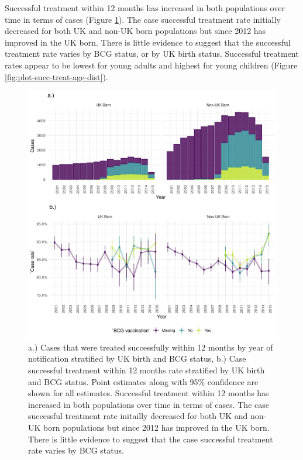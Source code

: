 \documentclass[11pt,twoside]{bristolthesis}
\begin{document}
  Successful treatment within 12 months has increased in both populations over time in terms of cases (Figure \ref{fig:plot-succ-treat-case-rate}). The case successful treatment rate initially decreased for both UK and non-UK born populations but since 2012 has improved in the UK born. There is little evidence to suggest that the successful treatment rate varies by BCG status, or by UK birth status. Successful treatment rates appear to be lowest for young adults and highest for young children (Figure \ref{fig:plot-succ-treat-age-dist}).
  \begin{figure}
  
  {\centering \includegraphics[width=0.8\linewidth,]{chapters/tb-epi-england/figures/plot-succ-treat-case-rate} 
  
  }
  
  \caption[a.) Cases that were treated successfully within 12 months by year of notification stratified by UK birth and BCG status, b.) Case successful treatment within 12 months rate stratified by UK birth and BCG status.]{a.) Cases that were treated successfully within 12 months by year of notification stratified by UK birth and BCG status, b.) Case successful treatment within 12 months rate stratified by UK birth and BCG status. Point estimates along with 95\% confidence are shown for all estimates. Successful treatment within 12 months has increased in both populations over time in terms of cases. The case successful treatment rate initailly decreased for both UK and non-UK born populations but since 2012 has improved in the UK born. There is little evidence to suggest that the case successful treatment rate varies by BCG status.}\label{fig:plot-succ-treat-case-rate}
  \end{figure}
\end{document}
